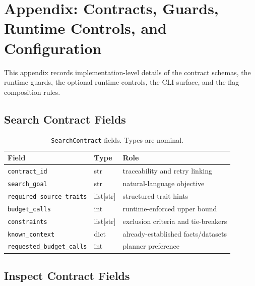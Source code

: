 \section{Appendix: Contracts, Guards, Runtime Controls, and Configuration}
\label{sec:appendix}

This appendix records implementation-level details of the contract schemas, the runtime guards, the optional runtime controls, the CLI surface, and the flag composition rules.

\subsection{Search Contract Fields}

\begin{table}[h]
\caption{\texttt{SearchContract} fields. Types are nominal.}
\label{tab:search-contract}
\centering
\begin{tabular}{lll}
\toprule
Field & Type & Role \\
\midrule
\texttt{contract\_id} & str & traceability and retry linking \\
\texttt{search\_goal} & str & natural-language objective \\
\texttt{required\_source\_traits} & list[str] & structured trait hints \\
\texttt{budget\_calls} & int & runtime-enforced upper bound \\
\texttt{constraints} & list[str] & exclusion criteria and tie-breakers \\
\texttt{known\_context} & dict & already-established facts/datasets \\
\texttt{requested\_budget\_calls} & int & planner preference \\
\bottomrule
\end{tabular}
\end{table}

\subsection{Inspect Contract Fields}

